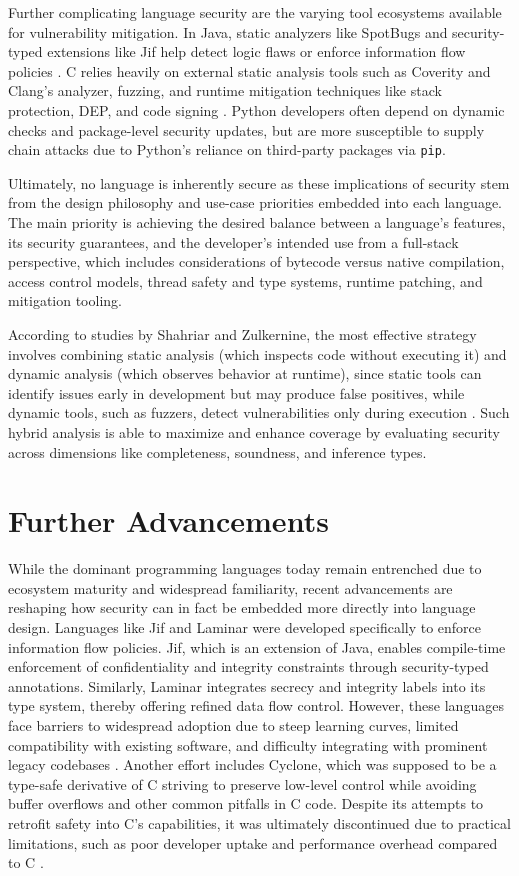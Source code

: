 \documentclass[conference]{IEEEtran}
\begin{document}
Further complicating language security are the varying tool ecosystems available for vulnerability mitigation. In Java, static analyzers like SpotBugs and security-typed extensions like Jif help detect logic flaws or enforce information flow policies \cite{Elahi2007}. C relies heavily on external static analysis tools such as Coverity and Clang's analyzer, fuzzing, and runtime mitigation techniques like stack protection, DEP, and code signing \cite{Shahriar2012}. Python developers often depend on dynamic checks and package-level security updates, but are more susceptible to supply chain attacks due to Python’s reliance on third-party packages via \texttt{pip}.

Ultimately, no language is inherently secure as these implications of security stem from the design philosophy and use-case priorities embedded into each language. The main priority is achieving the desired balance between a language’s features, its security guarantees, and the developer’s intended use from a full-stack perspective, which includes considerations of bytecode versus native compilation, access control models, thread safety and type systems, runtime patching, and mitigation tooling.

According to studies by Shahriar and Zulkernine, the most effective strategy involves combining static analysis (which inspects code without executing it) and dynamic analysis (which observes behavior at runtime), since static tools can identify issues early in development but may produce false positives, while dynamic tools, such as fuzzers, detect vulnerabilities only during execution \cite{Salka2005}. Such hybrid analysis is able to maximize and enhance coverage by evaluating security across dimensions like completeness, soundness, and inference types.




\section{Further Advancements}

While the dominant programming languages today remain entrenched due to ecosystem maturity and widespread familiarity, recent advancements are reshaping how security can in fact be embedded more directly into language design. Languages like Jif and Laminar were developed specifically to enforce information flow policies. Jif, which is an extension of Java, enables compile-time enforcement of confidentiality and integrity constraints through security-typed annotations. Similarly, Laminar integrates secrecy and integrity labels into its type system, thereby offering refined data flow control. However, these languages face barriers to widespread adoption due to steep learning curves, limited compatibility with existing software, and difficulty integrating with prominent legacy codebases \cite{Hamilton2015}.
Another effort includes Cyclone, which was supposed to be a type-safe derivative of C striving to preserve low-level control while avoiding buffer overflows and other common pitfalls in C code. Despite its attempts to retrofit safety into C's capabilities, it was ultimately discontinued due to practical limitations, such as poor developer uptake and performance overhead compared to C \cite{Shahriar2012}.
\end{document}
